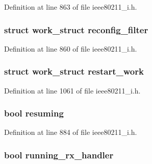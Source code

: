 Definition at line 863 of file ieee80211\-\_\-i.\-h.

\hypertarget{structieee80211__local_aeebe638f6e2c04a7481951fee56b1c9e}{
\subsubsection[{reconfig\-\_\-filter}]{\setlength{\rightskip}{0pt plus 5cm}struct work\-\_\-struct reconfig\-\_\-filter}}\label{structieee80211__local_aeebe638f6e2c04a7481951fee56b1c9e}


Definition at line 860 of file ieee80211\-\_\-i.\-h.

\hypertarget{structieee80211__local_aa77ee6794b746189308aeeceb3635838}{
\subsubsection[{restart\-\_\-work}]{\setlength{\rightskip}{0pt plus 5cm}struct work\-\_\-struct restart\-\_\-work}}\label{structieee80211__local_aa77ee6794b746189308aeeceb3635838}


Definition at line 1061 of file ieee80211\-\_\-i.\-h.

\hypertarget{structieee80211__local_a2ddb54f91088d41426fb0b5e4cb82022}{
\subsubsection[{resuming}]{\setlength{\rightskip}{0pt plus 5cm}bool resuming}}\label{structieee80211__local_a2ddb54f91088d41426fb0b5e4cb82022}


Definition at line 884 of file ieee80211\-\_\-i.\-h.

\hypertarget{structieee80211__local_a52eb7e26fdfb1a3b6469728a7131fe80}{
\subsubsection[{running\-\_\-rx\-\_\-handler}]{\setlength{\rightskip}{0pt plus 5cm}bool running\-\_\-rx\-\_\-handler}}\label{structieee80211__local_a52eb7e26fdfb1a3b6469728a7131fe80}


